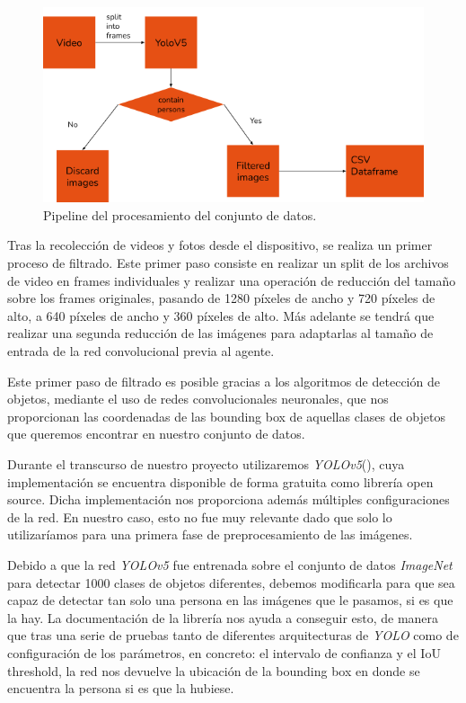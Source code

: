 \begin{figure}[ht!]
    \centering
    \includegraphics[scale=0.6]{figuras/data_preprocessing.png}
    \caption[Pipeline del procesamiento del conjunto de datos]{Pipeline del procesamiento del conjunto de datos.}
    \label{fig-preprocesamiento-datos}
\end{figure}


Tras la recolección de videos y fotos desde el dispositivo, se realiza un primer proceso de filtrado. Este primer paso consiste en realizar un split de los archivos de video en frames individuales y realizar una operación de reducción del tamaño sobre los frames originales, pasando de 1280 píxeles de ancho y 720 píxeles de alto, a 640 píxeles de ancho y 360 píxeles de alto. Más adelante se tendrá que realizar una segunda reducción de las imágenes para adaptarlas al tamaño de entrada de la red convolucional previa al agente.
\medskip

Este primer paso de filtrado es posible gracias a los algoritmos de detección de objetos, mediante el uso de redes convolucionales neuronales, que nos proporcionan las coordenadas de las bounding box de aquellas clases de objetos que queremos encontrar en nuestro conjunto de datos.
\medskip

Durante el transcurso de nuestro proyecto utilizaremos \textit{YOLOv5}(\citep{youonlylookonce}), cuya implementación se encuentra disponible de forma gratuita como librería open source. Dicha implementación nos proporciona además múltiples configuraciones de la red. En nuestro caso, esto no fue muy relevante dado que solo lo utilizaríamos para una primera fase de preprocesamiento de las imágenes.
\medskip


Debido a que la red \textit{YOLOv5} fue entrenada sobre el conjunto de datos \textit{ImageNet} \citep{imagenet} para detectar 1000 clases de objetos diferentes, debemos modificarla para que sea capaz de detectar tan solo una persona en las imágenes que le pasamos, si es que la hay. La documentación de la librería nos ayuda a conseguir esto, de manera que tras una serie de pruebas tanto de diferentes arquitecturas de \textit{YOLO} como de configuración de los parámetros, en concreto: el intervalo de confianza y  el IoU threshold, la red nos devuelve la ubicación de la bounding box en donde se encuentra la persona si es que la hubiese.
\medskip

